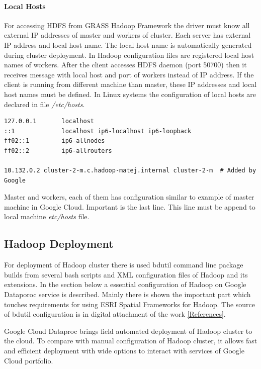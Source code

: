 \documentclass[a4paper,12pt,oneside]{report}
\begin{document}
	\paragraph{Local Hosts}\label{hosts} For accessing HDFS from GRASS Hadoop Framework the driver must
	know all external IP addresses of master and workers of cluster. Each server has
	external IP address and local host name. The local host name is automatically generated
	during cluster deployment. In Hadoop configuration files are registered local host
	names of workers. After the client accesses HDFS daemon (port 50700) then it receives
	message with local host and port of workers instead of IP address. If the client is
	running from different machine than master, these IP addresses and local host names
	must be defined. In Linux systems the configuration of local hosts  are declared in
	file \textit{/etc/hosts}. 
	\begin{footnotesize}
		\begin{lstlisting}[style=python]
127.0.0.1       localhost
::1             localhost ip6-localhost ip6-loopback
ff02::1         ip6-allnodes
ff02::2         ip6-allrouters

10.132.0.2 cluster-2-m.c.hadoop-matej.internal cluster-2-m  # Added by Google
		\end{lstlisting}
	\end{footnotesize}
	Master and workers, each of them has configuration similar to example of master
	machine in Google Cloud. Important is the  last line. This line must be append to local
	machine \textit{etc/hosts} file.	
	
\subsection{Hadoop Deployment}\label{hadoop_deployment}
	For deployment of Hadoop cluster there is used bdutil command line package builds from
	several bash scripts and XML configuration files of Hadoop and its extensions. 
	In the section below a essential configuration of Hadoop on Google Dataporoc 
	service is described. Mainly there is shown the important part which touches requirements for using
	ESRI Spatial Frameworks for Hadoop. The source of bdutil configuration  is in digital attachment of the work \ref{References}.
	
	Google Cloud Dataproc brings field automated deployment of Hadoop
	cluster to the cloud. To compare with manual configuration of Hadoop cluster, it allows fast and efficient
	deployment with wide options to interact with services of Google Cloud portfolio.
	
\end{document}
